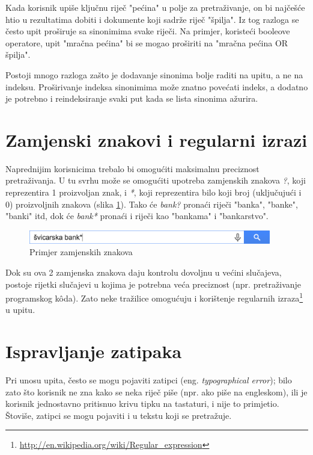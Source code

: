 \documentclass[a4paper,twoside,12pt]{memoir}
\begin{document}
Kada korisnik upiše ključnu riječ "pećina" u polje za pretraživanje, on bi najčešće htio u rezultatima dobiti i dokumente koji sadrže riječ "špilja". Iz tog razloga se često upit proširuje sa sinonimima svake riječi. Na primjer, koristeći booleove operatore, upit "mračna pećina" bi se mogao proširiti na "mračna pećina OR špilja".

Postoji mnogo razloga zašto je dodavanje sinonima bolje raditi na upitu, a ne na indeksu. Proširivanje indeksa sinonimima može znatno povećati indeks, a dodatno je potrebno i reindeksiranje svaki put kada se lista sinonima ažurira.

\section{Zamjenski znakovi i regularni izrazi}

Naprednijim korisnicima trebalo bi omogućiti maksimalnu preciznost pretraživanja. U tu svrhu može se omogućiti upotreba zamjenskih znakova \textit{?}, koji reprezentira 1 proizvoljan znak, i \textit{*}, koji reprezentira bilo koji broj (uključujući i 0) proizvoljnih znakova (slika \ref{wildcards}). Tako će \textit{bank?} pronaći riječi "banka", "banke", "banki" itd, dok će \textit{bank*} pronaći i riječi kao "bankama" i "bankarstvo".

\begin{figure}[H]
  \centering
  \includegraphics[width=300pt]{wildcards}
  \caption{Primjer zamjenskih znakova}
  \label{wildcards}
\end{figure}

Dok su ova 2 zamjenska znakova daju kontrolu dovoljnu u većini slučajeva, postoje rijetki slučajevi u kojima je potrebna veća preciznost (npr. pretraživanje programskog kôda). Zato neke tražilice omogućuju i korištenje regularnih izraza\footnote{\url{http://en.wikipedia.org/wiki/Regular_expression}} u upitu.

\section{Ispravljanje zatipaka}

Pri unosu upita, često se mogu pojaviti zatipci (eng. \textit{typographical error}); bilo zato što korisnik ne zna kako se neka riječ piše (npr. ako piše na engleskom), ili je korisnik jednostavno pritisnuo krivu tipku na tastaturi, i nije to primjetio. Štoviše, zatipci se mogu pojaviti i u tekstu koji se pretražuje.
\end{document}
